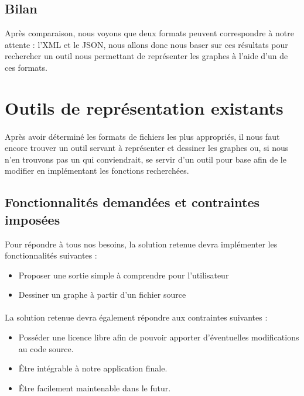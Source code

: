   \subsection{Bilan}
  Après comparaison, nous voyons que deux formats peuvent correspondre à notre attente : l'XML et le JSON, nous allons donc nous baser sur ces résultats pour rechercher un outil nous permettant de représenter les graphes à l'aide d'un de ces formats.

  \section{Outils de représentation existants}
  
  \paragraph{}
  Après avoir déterminé les formats de fichiers les plus appropriés, il nous faut encore trouver un outil servant à représenter et dessiner les graphes ou, si nous n'en trouvons pas un qui conviendrait, se servir d'un outil pour base afin de le modifier en implémentant les fonctions recherchées.
  
  \subsection{Fonctionnalités demandées et contraintes imposées}
  Pour répondre à tous nos besoins, la solution retenue devra implémenter les fonctionnalités suivantes : 
  \begin{itemize}
  	\item Proposer une sortie simple à comprendre pour l'utilisateur
  	\item Dessiner un graphe à partir d'un fichier source
  \end{itemize}
  
  \paragraph{}
  La solution retenue devra également répondre aux contraintes suivantes : 
  \begin{itemize}
  	\item Posséder une licence libre afin de pouvoir apporter d'éventuelles modifications au code source.
  	\item Être intégrable à notre application finale.
  	\item Être facilement maintenable dans le futur.
  \end{itemize}

